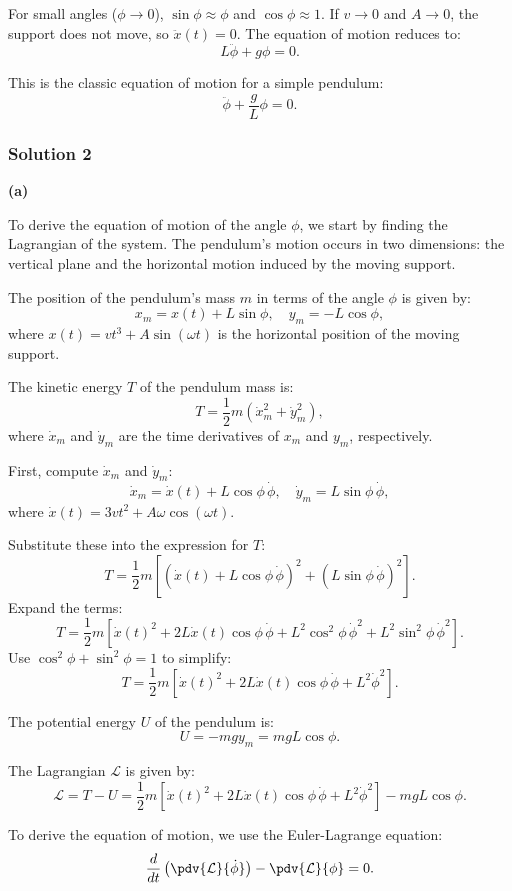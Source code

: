 \documentclass{article}
\begin{document}
For small angles ($\phi \to 0$), $\sin\phi \approx \phi$ and $\cos\phi \approx 1$. If $v \to 0$ and $A \to 0$, the support does not move, so $\ddot{x}(t) = 0$. The equation of motion reduces to:
\[
L\ddot{\phi} + g\phi = 0.
\]

This is the classic equation of motion for a simple pendulum:
\[
\boxed{\ddot{\phi} + \frac{g}{L}\phi = 0.}
\]

\subsubsection{Solution 2}
\textbf{(a)} 

To derive the equation of motion of the angle $\phi$, we start by finding the Lagrangian of the system. The pendulum's motion occurs in two dimensions: the vertical plane and the horizontal motion induced by the moving support. 

The position of the pendulum's mass $m$ in terms of the angle $\phi$ is given by:
\[
x_m = x(t) + L\sin\phi, \quad y_m = -L\cos\phi,
\]
where $x(t) = vt^3 + A\sin(\omega t)$ is the horizontal position of the moving support.

The kinetic energy $T$ of the pendulum mass is:
\[
T = \frac{1}{2}m\left(\dot{x}_m^2 + \dot{y}_m^2\right),
\]
where $\dot{x}_m$ and $\dot{y}_m$ are the time derivatives of $x_m$ and $y_m$, respectively.

First, compute $\dot{x}_m$ and $\dot{y}_m$:
\[
\dot{x}_m = \dot{x}(t) + L\cos\phi\,\dot{\phi}, \quad \dot{y}_m = L\sin\phi\,\dot{\phi},
\]
where $\dot{x}(t) = 3vt^2 + A\omega\cos(\omega t)$.

Substitute these into the expression for $T$:
\[
T = \frac{1}{2}m\left[\left(\dot{x}(t) + L\cos\phi\,\dot{\phi}\right)^2 + \left(L\sin\phi\,\dot{\phi}\right)^2\right].
\]
Expand the terms:
\[
T = \frac{1}{2}m\left[\dot{x}(t)^2 + 2L\dot{x}(t)\cos\phi\,\dot{\phi} + L^2\cos^2\phi\,\dot{\phi}^2 + L^2\sin^2\phi\,\dot{\phi}^2\right].
\]
Use $\cos^2\phi + \sin^2\phi = 1$ to simplify:
\[
T = \frac{1}{2}m\left[\dot{x}(t)^2 + 2L\dot{x}(t)\cos\phi\,\dot{\phi} + L^2\dot{\phi}^2\right].
\]

The potential energy $U$ of the pendulum is:
\[
U = -mg y_m = mgL\cos\phi.
\]

The Lagrangian $\mathcal{L}$ is given by:
\[
\mathcal{L} = T - U = \frac{1}{2}m\left[\dot{x}(t)^2 + 2L\dot{x}(t)\cos\phi\,\dot{\phi} + L^2\dot{\phi}^2\right] - mgL\cos\phi.
\]

To derive the equation of motion, we use the Euler-Lagrange equation:
\[
\frac{d}{dt}\left(\pdv{\mathcal{L}}{\dot{\phi}}\right) - \pdv{\mathcal{L}}{\phi} = 0.
\]
\end{document}
